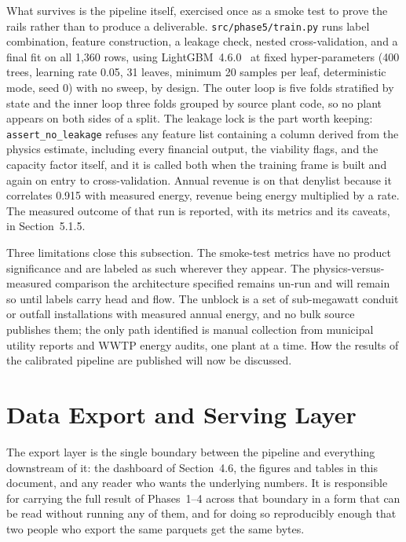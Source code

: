 \documentclass[12pt,letterpaper]{report}
\begin{document}
What survives is the pipeline itself, exercised once as a smoke test to prove the
rails rather than to produce a deliverable. \texttt{src/phase5/train.py} runs
label combination, feature construction, a leakage check, nested cross-validation,
and a final fit on all 1{,}360 rows, using LightGBM~4.6.0~\cite{lightgbm} at
fixed hyper-parameters (400 trees, learning rate 0.05, 31 leaves, minimum 20
samples per leaf, deterministic mode, seed 0) with no sweep, by design. The
outer loop is five folds stratified by state and the inner loop three folds
grouped by source plant code, so no plant appears on both sides of a split. The
leakage lock is the part worth keeping: \texttt{assert\_no\_leakage} refuses any
feature list containing a column derived from the physics estimate, including
every financial output, the viability flags, and the capacity factor itself, and
it is called both when the training frame is built and again on entry to
cross-validation. Annual revenue is on that denylist because it correlates 0.915
with measured energy, revenue being energy multiplied by a rate. The measured
outcome of that run is reported, with its metrics and its caveats, in
Section~5.1.5.

Three limitations close this subsection. The smoke-test metrics have no product
significance and are labeled as such wherever they appear. The
physics-versus-measured comparison the architecture specified remains un-run and
will remain so until labels carry head and flow. The unblock is a set of
sub-megawatt conduit or outfall installations with measured annual energy, and no
bulk source publishes them; the only path identified is manual collection from
municipal utility reports and WWTP energy audits, one plant at a time. How the
results of the calibrated pipeline are published will now be discussed.

\section{Data Export and Serving Layer}                  %

The export layer is the single boundary between the pipeline and everything
downstream of it: the dashboard of Section~4.6, the figures and tables in this
document, and any reader who wants the underlying numbers. It is responsible for
carrying the full result of Phases~1--4 across that boundary in a form that can be
read without running any of them, and for doing so reproducibly enough that two
people who export the same parquets get the same bytes.
\end{document}
